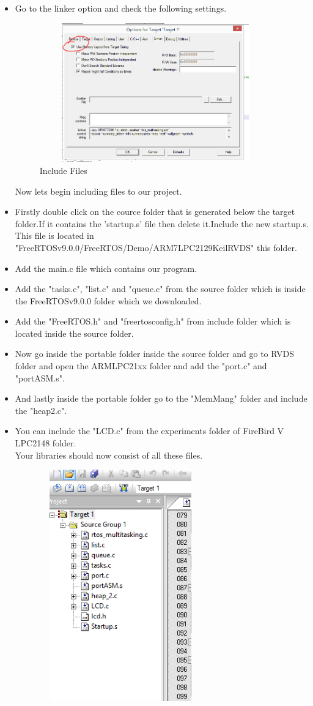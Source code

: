 \documentclass{article}
\begin{document}
\begin{enumerate}
\begin{itemize}
\item Go to the linker option and check the following settings.
\begin{figure}[H]
\centering
\includegraphics[width=10cm,height=6cm]{linker.PNG}
\caption{Include Files}
\end{figure}
Now lets begin including files to our project.
\item Firstly double click on the cource folder that is generated below the target folder.If it contains the 'startup.s' file then delete it.Include the new startup.s. This file is located in \\"FreeRTOSv9.0.0/FreeRTOS/Demo/ARM7LPC2129KeilRVDS" this folder.
\item Add the main.c file which contains our program.
\item Add the "tasks.c", "list.c" and "queue.c" from the source folder which is inside the FreeRTOSv9.0.0 folder which we downloaded.
\item Add the "FreeRTOS.h" and "freertosconfig.h" from include folder which is located inside the source folder.
\item Now go inside the portable folder inside the source folder and go to RVDS folder and open the ARMLPC21xx folder and add the "port.c" and "portASM.s".
\item And lastly inside the portable folder go to the "MemMang" folder and include the "heap2.c".
\item You can include the "LCD.c" from the experiments folder of FireBird V LPC2148 folder.\\
Your libraries should now consist of all these files.
\begin{figure}[H]
\centering
\includegraphics[width=7cm,height=10cm]{libraries.PNG}

\end{figure}
\end{itemize}
\end{enumerate}
\end{document}
